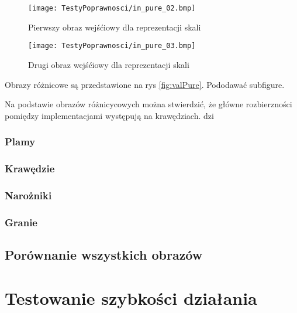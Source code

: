 \begin{figure}
\begin{center}
\texttt{[image: TestyPoprawnosci/in\_pure\_02.bmp]}
\end{center}
\caption{Pierwszy obraz wejśćiowy dla reprezentacji skali}
\label{fig:valPure02}
\end{figure}

\begin{figure}
\begin{center}
\texttt{[image: TestyPoprawnosci/in\_pure\_03.bmp]}
\end{center}
\caption{Drugi obraz wejśćiowy dla reprezentacji skali}
\label{fig:valPure03}
\end{figure}

Obrazy różnicowe są przedstawione na rys \ref{fig:valPure}. Pododawać subfigure.

Na podstawie obrazów różnicycowych można stwierdzić, że główne rozbierzności pomiędzy implementacjami występują na krawędziach.  dzi

\subsubsection{Plamy}
\label{subsubsec:plamyRysunki}

\subsubsection{Krawędzie}
\label{subsubsec:krawedzieRysunki}

\subsubsection{Narożniki}
\label{subsubsec:naroznikiRysunki}

\subsubsection{Granie}
\label{subsubsec:granieRysunki}

\subsection{Porównanie wszystkich obrazów}
\label{subsec:porownanieNumerycznePoprawnosc}


\section{Testowanie szybkości działania}
\label{sec:testSzybkosc1}

